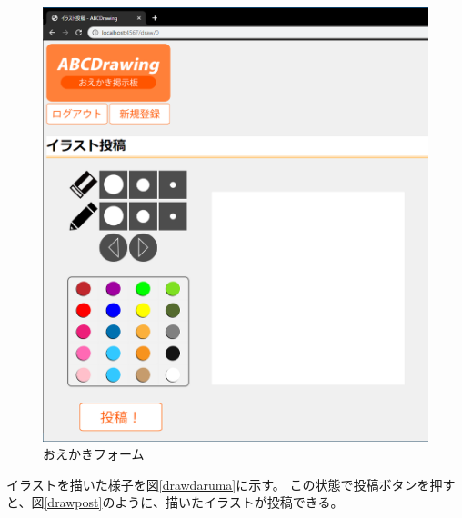 \documentclass[a4j,titlepage]{jsarticle}
\begin{document}
\begin{figure}[H]
  \centering
  \includegraphics[width=14cm]{draw.png}
  \caption{おえかきフォーム}
  \label{draw}
\end{figure}

イラストを描いた様子を図\ref{drawdaruma}に示す。
この状態で投稿ボタンを押すと、図\ref{drawpost}のように、描いたイラストが投稿できる。
\end{document}
